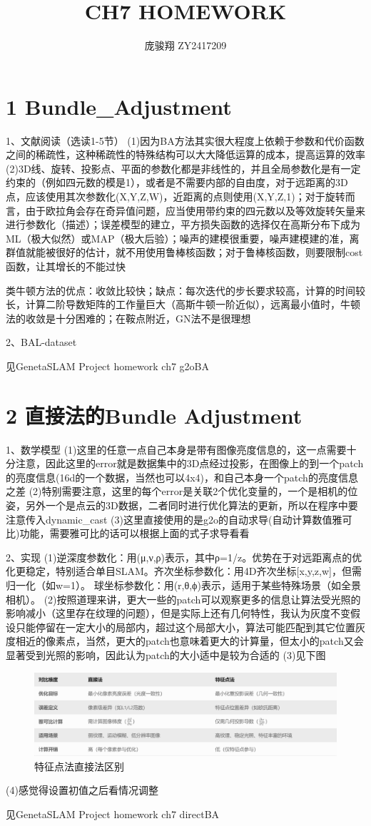 \documentclass[12pt, a4paper, oneside]{ctexart}
\title{\vspace{-4cm}\bfseries{CH7 HOMEWORK}}
\author{\large 庞骏翔 \quad ZY2417209}  %
\date{}
\begin{document}
	
	\pagestyle{plain}
	\maketitle
	\section{1 Bundle\_Adjustment}
	
	1、文献阅读（选读1-5节）
	(1)因为BA方法其实很大程度上依赖于参数和代价函数之间的稀疏性，这种稀疏性的特殊结构可以大大降低运算的成本，提高运算的效率
	(2)3D线、旋转、投影点、平面的参数化都是非线性的，并且全局参数化是有一定约束的（例如四元数的模是1），或者是不需要内部的自由度，对于远距离的3D点，应该使用其次参数化(X,Y,Z,W)，近距离的点则使用(X,Y,Z,1)；对于旋转而言，由于欧拉角会存在奇异值问题，应当使用带约束的四元数以及等效旋转矢量来进行参数化（描述）；误差模型的建立，平方损失函数的选择仅在高斯分布下成为ML（极大似然）或MAP（极大后验）；噪声的建模很重要，噪声建模建的准，离群值就能被很好的估计，就不用使用鲁棒核函数；对于鲁棒核函数，则要限制cost函数，让其增长的不能过快
	
	类牛顿方法的优点：收敛比较快；缺点：每次迭代的步长要求较高，计算的时间较长，计算二阶导数矩阵的工作量巨大（高斯牛顿一阶近似），远离最小值时，牛顿法的收敛是十分困难的；在鞍点附近，GN法不是很理想
	
	2、BAL-dataset


	见GenetaSLAM Project homework ch7 g2oBA
	
	\section{2 直接法的Bundle Adjustment}
	
	1、数学模型
	(1)这里的任意一点自己本身是带有图像亮度信息的，这一点需要十分注意，因此这里的error就是数据集中的3D点经过投影，在图像上的到一个patch的亮度信息(16d的一个数据，当然也可以4x4)，和自己本身一个patch的亮度信息之差
	(2)特别需要注意，这里的每个error是关联2个优化变量的，一个是相机的位姿，另外一个是点云的3D数据，二者同时进行优化算法的更新，所以在程序中要注意传入dynamic\_cast
	(3)这里直接使用的是g2o的自动求导(自动计算数值雅可比)功能，需要雅可比的话可以根据上面的式子求导看看
	
	2、实现
	(1)​逆深度参数化：用(μ,ν,ρ)表示，其中ρ=1/z。优势在于对远距离点的优化更稳定，特别适合单目SLAM。
	​	齐次坐标参数化：用4D齐次坐标[x,y,z,w]，但需归一化（如w=1）。
	​	球坐标参数化：用(r,θ,ϕ)表示，适用于某些特殊场景（如全景相机）。
	(2)按照道理来讲，更大一些的patch可以观察更多的信息让算法受光照的影响减小（这里存在纹理的问题），但是实际上还有几何特性，我认为灰度不变假设只能停留在一定大小的局部内，超过这个局部大小，算法可能匹配到其它位置灰度相近的像素点，当然，更大的patch也意味着更大的计算量，但太小的patch又会显著受到光照的影响，因此认为patch的大小适中是较为合适的
	(3)见下图
	
	\begin{figure}[h]
		\centering
		\centerline{\includegraphics[scale=0.38]{特征点法直接法区别.eps}}
		\caption{特征点法直接法区别}
	\end{figure}
	 
	(4)感觉得设置初值之后看情况调整

	见GenetaSLAM Project homework ch7 directBA
	
\end{document}
